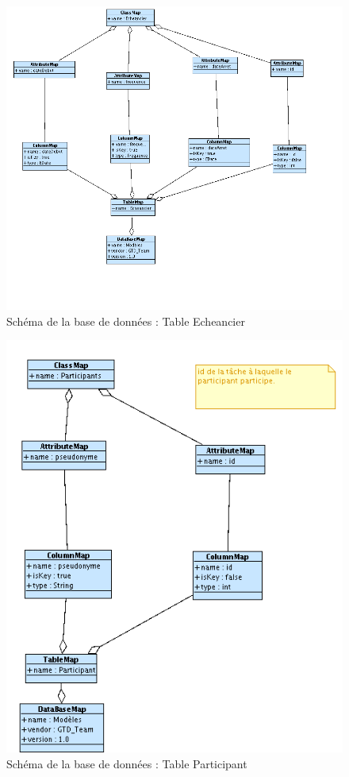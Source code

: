 \begin{figure}[htbp]

		\includegraphics[width=18cm]{images/L4/EcheancierDBS.png}
	\caption{Schéma de la base de données : Table Echeancier}
	\label{EcheancierDBS}
\end{figure}


\begin{figure}[htbp]

		\includegraphics[width=16cm]{images/L4/ParticipantDBS.png}
	\caption{Schéma de la base de données : Table Participant}
	\label{ParticipantDBS}
\end{figure}



